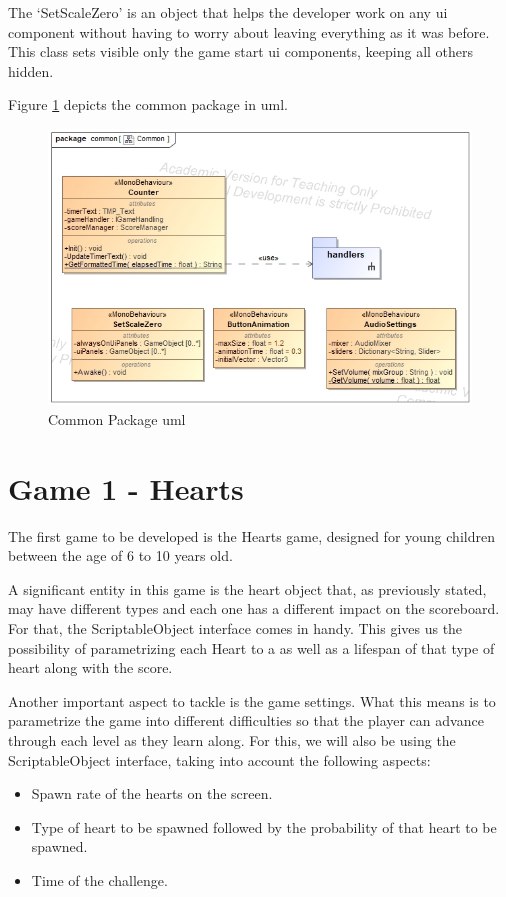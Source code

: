 The `SetScaleZero' is an object that helps the developer work on any \gls{ui} component without having to worry about leaving everything as it was before. This class sets visible only the game start \gls{ui} components, keeping all others hidden.

Figure \ref{fig:common-classes} depicts the common package in \gls{uml}.
\begin{figure}[H]
    \centering
    \includegraphics[width=0.8\linewidth]{Chapters/new_architechture/class__common__Common.jpg}
    \caption{Common Package \gls{uml}}
    \label{fig:common-classes}
\end{figure}

\section{Game 1 - Hearts}
\label{arqHearts}

The first game to be developed is the Hearts game, designed for young children between the age of 6 to 10 years old.

A significant entity in this game is the heart object that, as previously stated, may have different types and each one has a different impact on the scoreboard. For that, the ScriptableObject interface \cite{unityDocScriptableObj} comes in handy. This gives us the possibility of parametrizing each Heart to a  as well as a lifespan of that type of heart along with the score.

Another important aspect to tackle is the game settings. What this means is to parametrize the game into different difficulties so that the player can advance through each level as they learn along.
For this, we will also be using the ScriptableObject interface, taking into account the following aspects:

\begin{itemize}[noitemsep, topsep=5pt, parsep=5pt, partopsep=5pt]
    \item Spawn rate of the hearts on the screen.
    \item Type of heart to be spawned followed by the probability of that heart to be spawned.
    \item Time of the challenge.
\end{itemize}

